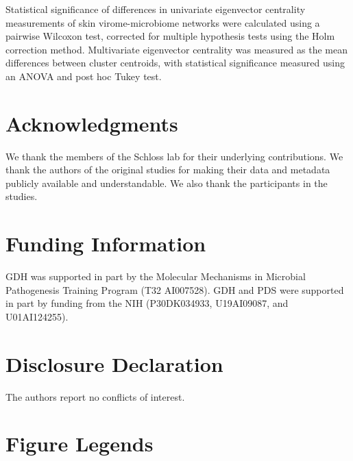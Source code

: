 \documentclass[12pt,]{article}
\begin{document}
Statistical significance of differences in univariate eigenvector
centrality measurements of skin virome-microbiome networks were
calculated using a pairwise Wilcoxon test, corrected for multiple
hypothesis tests using the Holm correction method. Multivariate
eigenvector centrality was measured as the mean differences between
cluster centroids, with statistical significance measured using an ANOVA
and post hoc Tukey test.

\section{Acknowledgments}\label{acknowledgments}

We thank the members of the Schloss lab for their underlying
contributions. We thank the authors of the original studies for making
their data and metadata publicly available and understandable. We also
thank the participants in the studies.

\section{Funding Information}\label{funding-information}

GDH was supported in part by the Molecular Mechanisms in Microbial
Pathogenesis Training Program (T32 AI007528). GDH and PDS were supported
in part by funding from the NIH (P30DK034933, U19AI09087, and
U01AI124255).

\section{Disclosure Declaration}\label{disclosure-declaration}

The authors report no conflicts of interest.

\newpage

\section{Figure Legends}\label{figure-legends}
\end{document}
